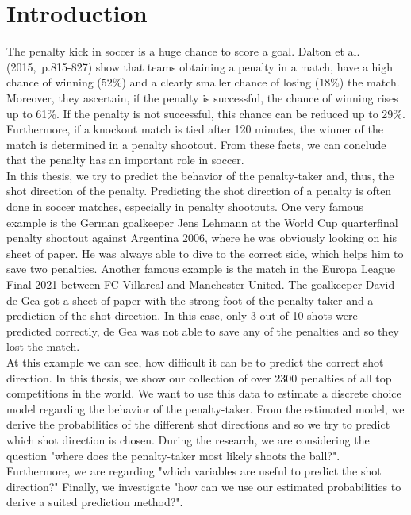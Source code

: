 \documentclass[12pt,dvipsnames]{article}%
\begin{document}

\newpage
{}
\section{Introduction}

The penalty kick in soccer is a huge chance to score a goal. Dalton et al. \mbox{(2015, p.815-827)} show that teams obtaining a penalty in a match, have a high chance of winning ($52\%$) and a clearly smaller chance of losing ($18\%$) the match. Moreover, they ascertain, if the penalty is successful, the chance of winning rises up to 61$\%$. If the penalty is not successful, this chance can be reduced up to 29$\%$. Furthermore, if a knockout match is tied after 120 minutes, the winner of the match is determined in a penalty shootout. From these facts, we can conclude that the penalty has an important role in soccer. \\
In this thesis, we try to predict the behavior of the penalty-taker and, thus, the shot direction of the penalty. Predicting the shot direction of a penalty is often done in soccer matches, especially in penalty shootouts. One very famous example is the German goalkeeper Jens Lehmann at the World Cup quarterfinal penalty shootout against Argentina 2006, where he was obviously looking on his sheet of paper. He was always able to dive to the correct side, which helps him to save two penalties. Another famous example is the match in the Europa League Final 2021 between FC Villareal and Manchester United. The goalkeeper David de Gea got a sheet of paper with the strong foot of the penalty-taker and a prediction of the shot direction. In this case, only 3 out of 10 shots were predicted correctly, de Gea was not able to save any of the penalties and so they lost the match. \\
At this example we can see, how difficult it can be to predict the correct shot direction.
In this thesis, we show our collection of over 2300 penalties of all top competitions in the world. We want to use this data to estimate a discrete choice model regarding the behavior of the penalty-taker. From the estimated model, we derive the probabilities of the different shot directions and so we try to predict which shot direction is chosen.  During the research, we are considering the question "where does the penalty-taker most likely shoots the ball?". Furthermore, we are regarding "which variables are useful to predict the shot direction?"  Finally, we investigate "how can we use our estimated probabilities to derive a suited prediction method?".  \\
\end{document}
